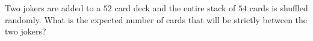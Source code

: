 Two jokers are added to a $52$ card deck and the entire stack of $54$ cards is shuffled randomly. What is the expected number of cards that will be strictly between the two jokers?